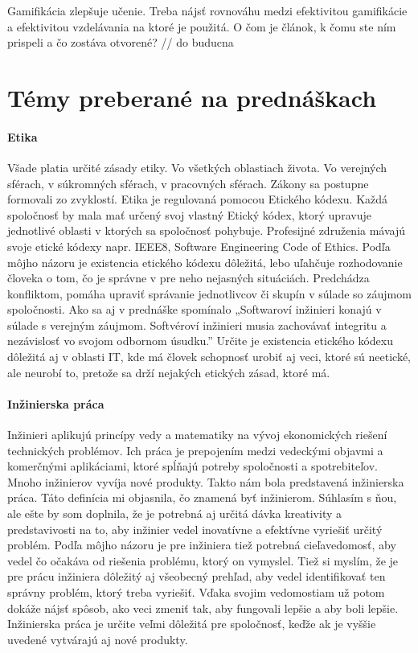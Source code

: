 \documentclass[10pt,twoside,slovak,a4paper]{article}
\begin{document}
Gamifikácia zlepšuje učenie. Treba nájsť rovnováhu medzi efektivitou gamifikácie a efektivitou vzdelávania na ktoré je použitá.
O čom je článok, k čomu ste ním prispeli a čo zostáva otvorené? // do buducna %

\section{Témy preberané na prednáškach} 

\paragraph{Etika}
Všade platia určité zásady etiky. Vo všetkých oblastiach života. Vo verejných sférach, v súkromných sférach, v pracovných sférach. Zákony sa postupne formovali zo zvyklostí. Etika je regulovaná pomocou Etického kódexu. Každá spoločnosť by mala mať určený svoj vlastný Etický kódex, ktorý upravuje jednotlivé oblasti v ktorých sa spoločnosť pohybuje. Profesijné združenia mávajú svoje etické kódexy napr. IEEE8, Software Engineering Code of Ethics. Podľa môjho názoru je existencia etického kódexu dôležitá, lebo uľahčuje rozhodovanie človeka o tom, čo je správne v pre neho nejasných situáciách. Predchádza konfliktom, pomáha upraviť správanie jednotlivcov či skupín v súlade so záujmom spoločnosti. Ako sa aj v prednáške spomínalo „Softwaroví inžinieri konajú v súlade s verejným záujmom. Softvéroví inžinieri musia zachovávať integritu a nezávislosť vo svojom odbornom úsudku.” Určite je existencia etického kódexu dôležitá aj v oblasti IT, kde má človek schopnosť urobiť aj veci, ktoré sú neetické, ale neurobí to, pretože sa drží nejakých etických zásad, ktoré má. 

\paragraph{Inžinierska práca}
Inžinieri aplikujú princípy vedy a matematiky na vývoj ekonomických riešení technických problémov. Ich práca je prepojením medzi vedeckými objavmi a komerčnými aplikáciami, ktoré spĺňajú potreby spoločnosti a spotrebiteľov. Mnoho inžinierov vyvíja nové produkty. \cite{Engineers} Takto nám bola predstavená inžinierska práca. Táto definícia mi objasnila, čo znamená byť inžinierom. Súhlasím s ňou, ale ešte by som doplnila, že je potrebná aj určitá dávka kreativity a predstavivosti na to, aby inžinier vedel inovatívne a efektívne vyriešiť určitý problém. Podľa môjho názoru je pre inžiniera tiež potrebná cieľavedomosť, aby vedel čo očakáva od riešenia problému, ktorý on vymyslel. Tiež si myslím, že je pre prácu inžiniera dôležitý aj všeobecný prehľad, aby vedel identifikovať ten správny problém, ktorý treba vyriešiť. Vďaka svojim vedomostiam už potom dokáže nájsť spôsob, ako veci zmeniť tak, aby fungovali lepšie a aby boli lepšie. Inžinierska práca je určite veľmi dôležitá pre spoločnosť, keďže ak je vyššie uvedené vytvárajú aj nové produkty.
\end{document}
